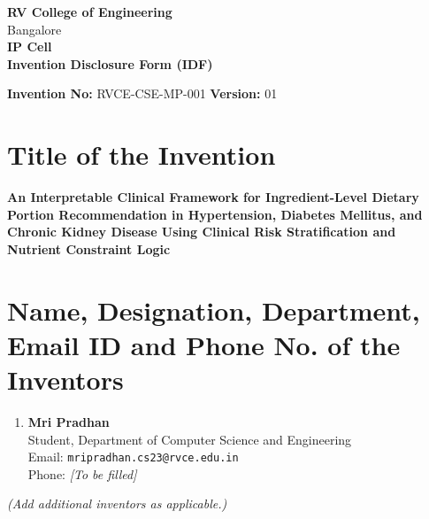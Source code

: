 \documentclass[a4paper,12pt]{article}
\begin{document}
\begin{center}
    \textbf{\Large RV College of Engineering} \\
    Bangalore \\
    \textbf{IP Cell} \\
    \vspace{0.5cm}
    \textbf{\Large Invention Disclosure Form (IDF)}
\end{center}

\vspace{0.5cm}

\noindent \textbf{Invention No:} RVCE-CSE-MP-001 \hfill \textbf{Version:} 01

\hrulefill

\section*{Title of the Invention}

\textbf{An Interpretable Clinical Framework for Ingredient-Level Dietary Portion Recommendation in Hypertension, Diabetes Mellitus, and Chronic Kidney Disease Using Clinical Risk Stratification and Nutrient Constraint Logic}

\section*{Name, Designation, Department, Email ID and Phone No. of the Inventors}

\begin{enumerate}
    \item \textbf{Mri Pradhan} \\
    Student, Department of Computer Science and Engineering \\
    Email: \texttt{mripradhan.cs23@rvce.edu.in} \\
    Phone: \textit{[To be filled]}
\end{enumerate}

\textit{(Add additional inventors as applicable.)}

\end{document}
